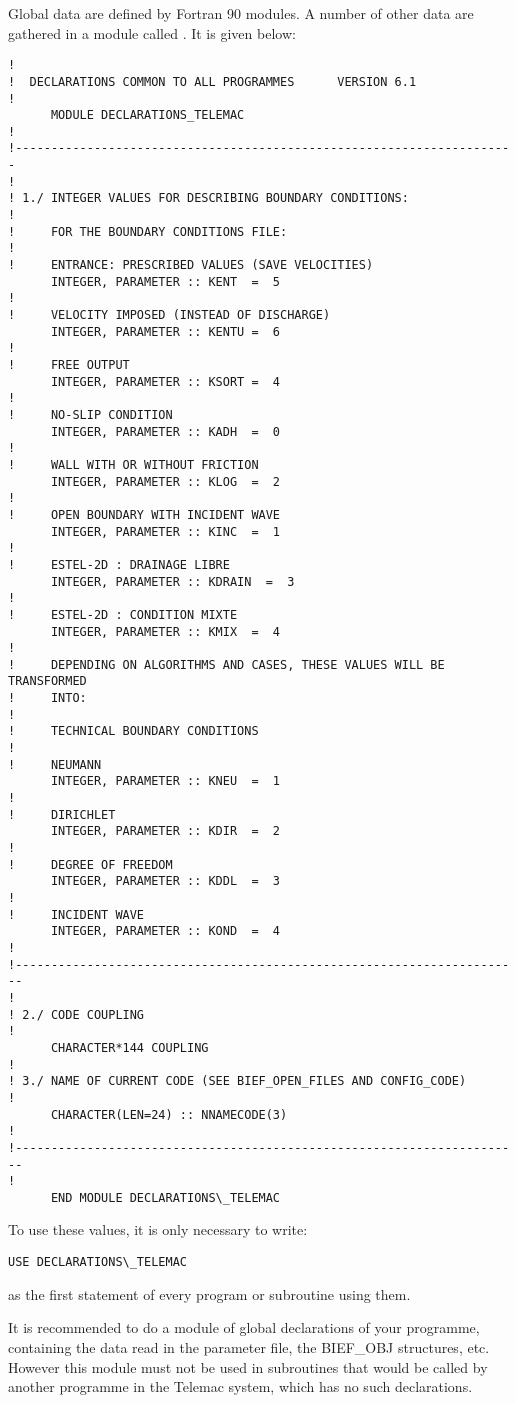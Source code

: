 Global data are defined by Fortran 90 modules. A number of other data are
gathered in a \bief module called . It is given
below:
\begin{lstlisting}[language=TelFortran]
!
!  DECLARATIONS COMMON TO ALL PROGRAMMES      VERSION 6.1
!
      MODULE DECLARATIONS_TELEMAC
!
!----------------------------------------------------------------------
!
! 1./ INTEGER VALUES FOR DESCRIBING BOUNDARY CONDITIONS:
!
!     FOR THE BOUNDARY CONDITIONS FILE:
!
!     ENTRANCE: PRESCRIBED VALUES (SAVE VELOCITIES)
      INTEGER, PARAMETER :: KENT  =  5
!
!     VELOCITY IMPOSED (INSTEAD OF DISCHARGE)
      INTEGER, PARAMETER :: KENTU =  6
!
!     FREE OUTPUT
      INTEGER, PARAMETER :: KSORT =  4
!
!     NO-SLIP CONDITION
      INTEGER, PARAMETER :: KADH  =  0
!
!     WALL WITH OR WITHOUT FRICTION
      INTEGER, PARAMETER :: KLOG  =  2
!
!     OPEN BOUNDARY WITH INCIDENT WAVE
      INTEGER, PARAMETER :: KINC  =  1
!
!     ESTEL-2D : DRAINAGE LIBRE
      INTEGER, PARAMETER :: KDRAIN  =  3
!
!     ESTEL-2D : CONDITION MIXTE
      INTEGER, PARAMETER :: KMIX  =  4
!
!     DEPENDING ON ALGORITHMS AND CASES, THESE VALUES WILL BE TRANSFORMED
!     INTO:
!
!     TECHNICAL BOUNDARY CONDITIONS
!
!     NEUMANN
      INTEGER, PARAMETER :: KNEU  =  1
!
!     DIRICHLET
      INTEGER, PARAMETER :: KDIR  =  2
!
!     DEGREE OF FREEDOM
      INTEGER, PARAMETER :: KDDL  =  3
!
!     INCIDENT WAVE
      INTEGER, PARAMETER :: KOND  =  4
!
!-----------------------------------------------------------------------
!
! 2./ CODE COUPLING
!
      CHARACTER*144 COUPLING
!
! 3./ NAME OF CURRENT CODE (SEE BIEF_OPEN_FILES AND CONFIG_CODE)
!
      CHARACTER(LEN=24) :: NNAMECODE(3)
!
!-----------------------------------------------------------------------
!
      END MODULE DECLARATIONS\_TELEMAC
\end{lstlisting}

To use these values, it is only necessary to write:
\begin{lstlisting}[language=TelFortran]
USE DECLARATIONS\_TELEMAC
\end{lstlisting}
as the first statement of every program or subroutine using them.

It is recommended to do a module of global declarations of your programme,
containing the data read in the parameter file, the BIEF\_OBJ structures, etc.
However this module must not be used in subroutines that would be called by
another programme in the Telemac system, which has no such declarations.

